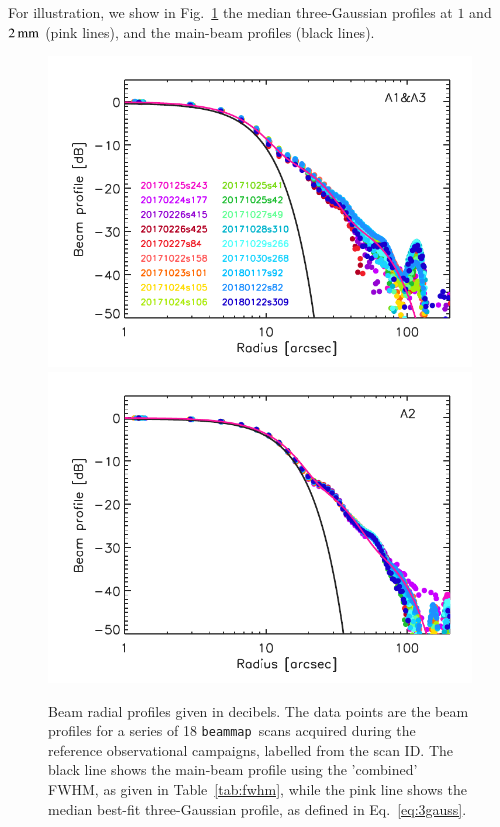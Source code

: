 \documentclass[traditionalabstract]{aa}
\newcommand{\bm}{{\tt beammap}}
\newcommand{\lp}[1]{#1}
\begin{document}
{{\lp For illustration, we show in
Fig.~\ref{fig:beam_prof} the median 
three-Gaussian profiles at $1$ and $2\,\rm{mm}$ (pink lines), and
the main-beam profiles (black lines). }


\begin{figure}[!thbp]
  \centering
   \includegraphics[clip, width=\linewidth]{Figures/plot_profiles_dB_1mm.pdf}
   \includegraphics[clip, width=\linewidth]{Figures/plot_profiles_dB_a2.pdf}
  \caption[Stability of the beam profile]{{\lp Beam radial
    profiles given in decibels. %
    The data points are the beam profiles for a series of 18
    \bm\ scans acquired during the reference observational campaigns, labelled from the scan
    ID. The black line shows the main-beam profile using the 'combined'
    FWHM, as given in Table~\ref{tab:fwhm}, while the pink
    line shows the median best-fit three-Gaussian profile, as defined
    in Eq.~\ref{eq:3gauss}.}}
  \label{fig:beam_prof}
\end{figure}

}
\end{document}
